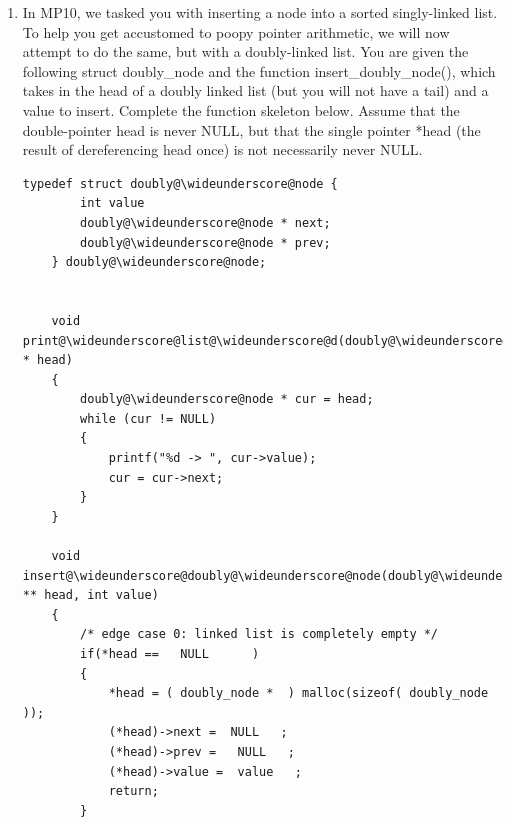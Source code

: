 \documentclass{article}
\begin{document}
\begin{enumerate}[label=(\alph*)]
\begin{lstlisting}[style=CStyle]
int main () {
    Student all_students[5];
    // Load data into all students:
    load_students(all@\wideunderscore@students, 5);
    // Find the student with the highest GPA:
    Student* best@\wideunderscore@student = 
    find@\wideunderscore@best(all@\wideunderscore@students, 5,         );
    printf("Best GPA:%f\n",         );
}

void find@\wideunderscore@best(Student* all, int num@\wideunderscore@students, Student** best) {
    for (int i = 0; i < num@\wideunderscore@students; i++) {
        if (all[i].GPA >        ) {
            // Fill:
        }
    }
}

\end{lstlisting}
\textcolor{blue} {
\&(all\_students[0])  \newline
\&best\_student   \newline
best\_student-$>$GPA  \newline
(*best)-$>$GPA  \newline
*best = \&(all[i]) \newline
}


\item In MP10, we tasked you with inserting a node into a sorted singly-linked list. To help you get accustomed to poopy pointer arithmetic, we will now attempt to do the same, but with a doubly-linked list. You are given the following struct doubly\_node and the function insert\_doubly\_node(), which takes in the head of a doubly linked list (but you will not have a tail) and a value to insert. Complete the function skeleton below. Assume that the double-pointer head is never NULL, but that the single pointer *head (the result of dereferencing head once) is not necessarily never NULL.

\begin{lstlisting}[style = CStyle]
    typedef struct doubly@\wideunderscore@node {
        int value
        doubly@\wideunderscore@node * next;
        doubly@\wideunderscore@node * prev;
    } doubly@\wideunderscore@node;


    void print@\wideunderscore@list@\wideunderscore@d(doubly@\wideunderscore@node * head)
    {
        doubly@\wideunderscore@node * cur = head;
        while (cur != NULL)
        {
            printf("%d -> ", cur->value);
            cur = cur->next;
        }
    }

    void insert@\wideunderscore@doubly@\wideunderscore@node(doubly@\wideunderscore@node ** head, int value) 
    {
        /* edge case 0: linked list is completely empty */
        if(*head ==   NULL      ) 
        {
            *head = ( doubly_node *  ) malloc(sizeof( doubly_node  ));
            (*head)->next =  NULL   ;
            (*head)->prev =   NULL   ;
            (*head)->value =  value   ;
            return;
        }


\end{lstlisting}
\end{enumerate}
\end{document}
